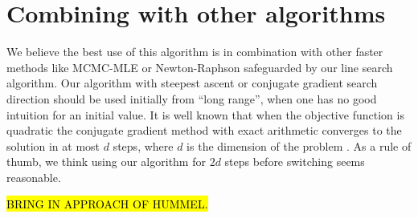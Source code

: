 \section{Combining with other algorithms} \label{S:Combine}
We believe the best use of this algorithm is in combination with other faster methods 
like MCMC-MLE \citep{Geyer:1992}
or Newton-Raphson safeguarded by our line search algorithm.  Our algorithm with 
steepest ascent or conjugate gradient search direction
should be used initially from ``long range'', when one has no good intuition for an 
initial value.
It is well known that when the objective function is quadratic the conjugate gradient 
method with exact arithmetic converges to the solution
in at most $d$ steps, where $d$ is the dimension of the problem \citep{NW}.  As a rule 
of thumb, we think using our 
algorithm for $2d$ steps before switching seems reasonable.

\hl{BRING IN APPROACH OF HUMMEL.}


